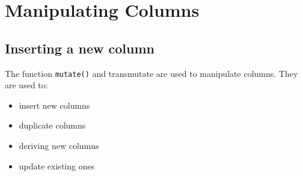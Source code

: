 \documentclass[
]{book}
\providecommand{\tightlist}{%
  \setlength{\itemsep}{0pt}\setlength{\parskip}{0pt}}
\begin{document}
\hypertarget{tr-changing}{%
\section{Manipulating Columns}\label{tr-changing}}

\hypertarget{inserting-a-new-column-1}{%
\subsection{Inserting a new column}\label{inserting-a-new-column-1}}

The function \texttt{mutate()} and transmutate are used to manipulate columns. They are used to:

\begin{itemize}
\tightlist
\item
  insert new columns
\item
  duplicate columns
\item
  deriving new columns
\item
  update existing ones
\end{itemize}
\end{document}
